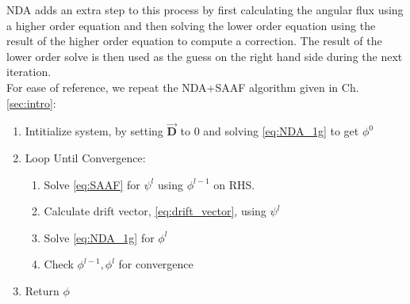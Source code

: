 NDA adds an extra step to this process by first calculating the angular flux using a higher order equation and then solving the lower order equation using the result of the higher order equation to compute a correction. The result of the lower order solve is then used as the guess on the right hand side during the next iteration. \\
For ease of reference, we repeat the NDA+SAAF algorithm given in Ch. \ref{sec:intro}: 

\begin{enumerate}
    \item Intitialize system, by setting $\vec{\textbf{D}}$ to 0 and solving \eqref{eq:NDA_1g} to get $\phi^0$ 
    \item Loop Until Convergence:
        \begin{enumerate}
            \item Solve \eqref{eq:SAAF} for $\psi^l$ using $\phi^{l-1}$ on RHS.
            \item Calculate drift vector, \eqref{eq:drift_vector}, using $\psi^l$
            \item Solve \eqref{eq:NDA_1g} for $\phi^l$
            \item Check $\phi^{l-1}, \phi^l$ for convergence
        \end{enumerate}
    \item Return $\phi$
\end{enumerate}

